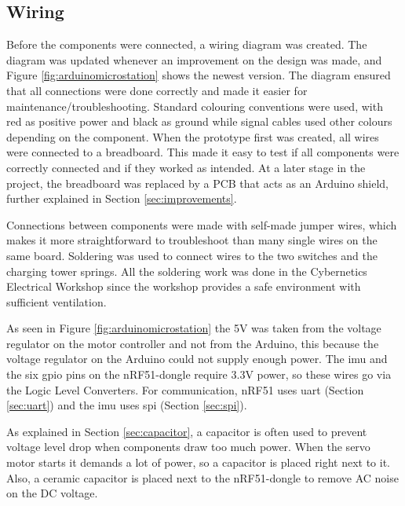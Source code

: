 \subsection{Wiring}
Before the components were connected, a wiring diagram was created. The diagram was updated whenever an improvement on the design was made, and Figure \ref{fig:arduinomicrostation} shows the newest version. The diagram ensured that all connections were done correctly and made it easier for maintenance/troubleshooting. Standard colouring conventions were used, with red as positive power and black as ground while signal cables used other colours depending on the component. When the prototype first was created, all wires were connected to a breadboard. This made it easy to test if all components were correctly connected and if they worked as intended. At a later stage in the project, the breadboard was replaced by a PCB that acts as an Arduino shield, further explained in Section \ref{sec:improvements}.

Connections between components were made with self-made jumper wires, which makes it more straightforward to troubleshoot than many single wires on the same board. Soldering was used to connect wires to the two switches and the charging tower springs. All the soldering work was done in the Cybernetics Electrical Workshop since the workshop provides a safe environment with sufficient ventilation.

As seen in Figure \ref{fig:arduinomicrostation} the 5V was taken from the voltage regulator on the motor controller and not from the Arduino, this because the voltage regulator on the Arduino could not supply enough power. The \acrshort{imu} and the six \acrshort{gpio} pins on the nRF51-dongle require 3.3V power, so these wires go via the Logic Level Converters. For communication, nRF51 uses \acrshort{uart} (Section \ref{sec:uart}) and the \acrshort{imu} uses \acrshort{spi} (Section \ref{sec:spi}).

As explained in Section \ref{sec:capacitor}, a capacitor is often used to prevent voltage level drop when components draw too much power. When the servo motor starts it demands a lot of power, so a capacitor is placed right next to it. Also, a ceramic capacitor is placed next to the nRF51-dongle to remove AC noise on the DC voltage. 